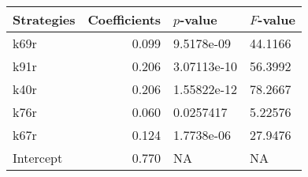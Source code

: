 \begin{tabular}{lrll}
\toprule
Strategies &  Coefficients &    $p$-value & $F$-value \\
\midrule
      k69r &         0.099 &   9.5178e-09 &   44.1166 \\
      k91r &         0.206 &  3.07113e-10 &   56.3992 \\
      k40r &         0.206 &  1.55822e-12 &   78.2667 \\
      k76r &         0.060 &    0.0257417 &   5.22576 \\
      k67r &         0.124 &   1.7738e-06 &   27.9476 \\
 Intercept &         0.770 &           NA &        NA \\
\bottomrule
\end{tabular}

